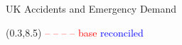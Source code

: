 \documentclass[14pt]{beamer}
\begin{document}



\begin{frame}{\large UK Accidents and Emergency Demand}

\begin{textblock}{12}(0.3,8.5)
\textcolor{red}{-- -- -- -- base} \hspace*{1cm}
\textcolor{blue}{\raisebox{0.5ex}{\rule{1.5cm}{1pt}} reconciled}
\end{textblock}
\end{frame}
\end{document}
